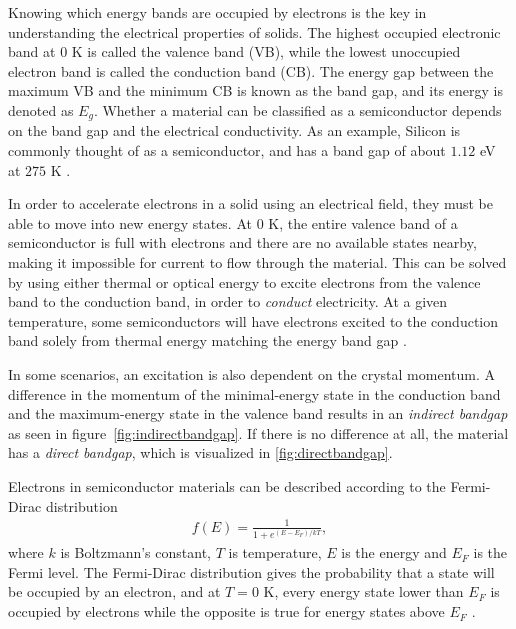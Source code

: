 Knowing which energy bands are occupied by electrons is the key in understanding the electrical properties of solids. The highest occupied electronic band at $0$ K is called the valence band (VB), while the lowest unoccupied electron band is called the conduction band (CB). The energy gap between the maximum VB and the minimum CB is known as the band gap, and its energy is denoted as $E_g$. Whether a material can be classified as a semiconductor depends on the band gap and the electrical conductivity. As an example, Silicon is commonly thought of as a semiconductor, and has a band gap of about $1.12$ eV at $275$ K \cite{Martienssen2005}.

In order to accelerate electrons in a solid using an electrical field, they must be able to move into new energy states. At $0$ K, the entire valence band of a semiconductor is full with electrons and there are no available states nearby, making it impossible for current to flow through the material. This can be solved by using either thermal or optical energy to excite electrons from the valence band to the conduction band, in order to \textit{conduct} electricity. At a given temperature, some semiconductors will have electrons excited to the conduction band solely from thermal energy matching the energy band gap \cite{BenStreetman2015}.



In some scenarios, an excitation is also dependent on the crystal momentum.
A difference in the momentum of the minimal-energy state in the conduction band and the maximum-energy state in the valence band results in an \textit{indirect bandgap} as seen in figure \autoref{fig:indirectbandgap}. If there is no difference at all, the material has a \textit{direct bandgap}, which is visualized in \autoref{fig:directbandgap}.

Electrons in semiconductor materials can be described according to the Fermi-Dirac distribution
\begin{align*}
  f(E) = \frac{1}{1+e^{(E-E_F)/kT}},
\end{align*}
where $k$ is Boltzmann's constant, $T$ is temperature, $E$ is the energy and $E_F$ is the Fermi level. The Fermi-Dirac distribution gives the probability that a state will be occupied by an electron, and at $T=0$ K, every energy state lower than $E_F$ is occupied by electrons while the opposite is true for energy states above $E_F$ \cite{BenStreetman2015}.

